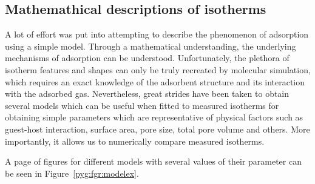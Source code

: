 
\subsection{Mathemathical descriptions of isotherms}%
\label{pyg:models}

A lot of effort was put into attempting to describe
the phenomenon of adsorption using a simple model.
Through a mathematical understanding, the underlying
mechanisms of adsorption can be understood.
Unfortunately, the plethora of isotherm
features and shapes can only be truly recreated
by molecular simulation, which requires an exact
knowledge of the adsorbent structure and its interaction
with the adsorbed gas.
Nevertheless, great strides have been taken to
obtain several models which can be useful
when fitted to measured isotherms
for obtaining simple parameters which are
representative of physical factors such as
guest-host interaction, surface area, pore size,
total pore volume and others.
More importantly, it allows us to numerically
compare measured isotherms.

A page of figures for different models with several
values of their parameter can be seen in
Figure~\ref{pyg:fgr:modelex}.


